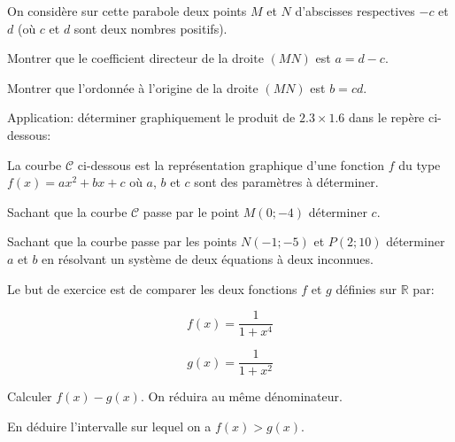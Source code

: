\documentclass[a4paper,12pt]{scrartcl}
\begin{document}
On considère sur cette parabole deux points $M$ et $N$ d'abscisses respectives $-c$ et $d$ (où $c$ et $d$ sont deux nombres positifs).

\question{}
Montrer que le coefficient directeur de la droite $(MN)$ est $a = d - c$.

\question{}
Montrer que l'ordonnée à l'origine de la droite $(MN)$ est $b = cd$.

\question{}
Application: déterminer graphiquement le produit de $2.3 \times 1.6$ dans le repère ci-dessous: 

\begin{center}
\end{center}

\exo{}
La courbe $\mathcal{C}$ ci-dessous est la représentation graphique d'une fonction $f$ du type $f(x) = ax^2 + bx + c$ où $a$, $b$ et $c$ sont des paramètres à déterminer. 

\begin{center}
\end{center}

\question{}
Sachant que la courbe $\mathcal{C}$ passe par le point $M(0 ; -4)$ déterminer $c$.

\question{}
Sachant que la courbe passe par les points $N(-1 ;-5)$  et $P(2 ; 10)$ déterminer $a$ et $b$ en résolvant un système de deux équations à deux inconnues.

\exo{}
Le but de exercice est de comparer les deux fonctions $f$ et $g$ définies sur $\mathbb{R}$ par: 

\begin{equation*}
f(x) = \frac{1}{1+x^4}
\end{equation*}

\begin{equation*}
g(x) = \frac{1}{1+x^2}
\end{equation*}

\question{}
Calculer $f(x) - g(x)$. On réduira au même dénominateur.

\question{}
En déduire l'intervalle sur lequel on a $f(x) > g(x)$.

 
\end{document}
